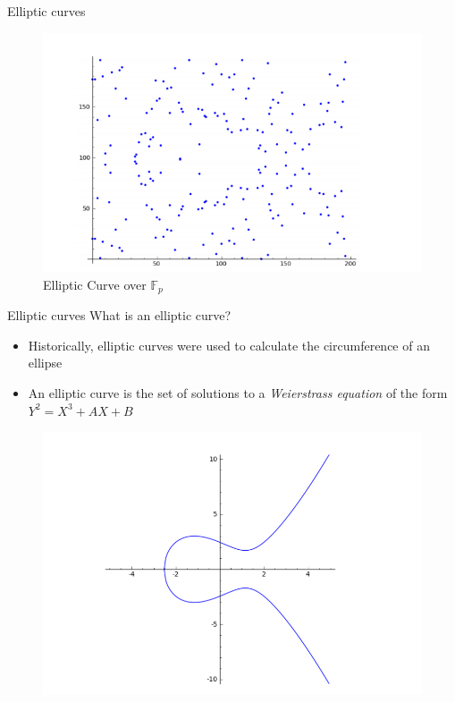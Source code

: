 \documentclass{beamer}
\begin{document}
\begin{frame}{Elliptic curves}
\begin{figure}
\begin{minipage}{0.48\textwidth}
		\caption{Elliptic Curve over $\mathbb{C}$}\label{fig:elliptic_curve_c}
	\end{minipage}\hfill
	\begin{minipage}{0.48\textwidth}
		\centering
		\includegraphics[width=.7\linewidth]{elliptic_curve_fp}
		\caption{Elliptic Curve over $\mathbb{F}_p$}\label{fig:elliptic_curve_fp]}
	\end{minipage}
\end{figure}

\end{frame}
\begin{frame}{Elliptic curves}
What is an elliptic curve?
\begin{itemize}[\textbullet]
	\item Historically, elliptic curves were used to calculate the circumference of an ellipse
	\item An elliptic curve is the set of solutions to a \textit{Weierstrass equation} of the form $Y^2=X^3+AX+B$
\end{itemize}

\begin{figure}
	\centering
	\includegraphics[width=.7\linewidth]{elliptic_curve}
	\label{fig:elliptic_curve}
\end{figure}
	
\end{frame}
\end{document}
